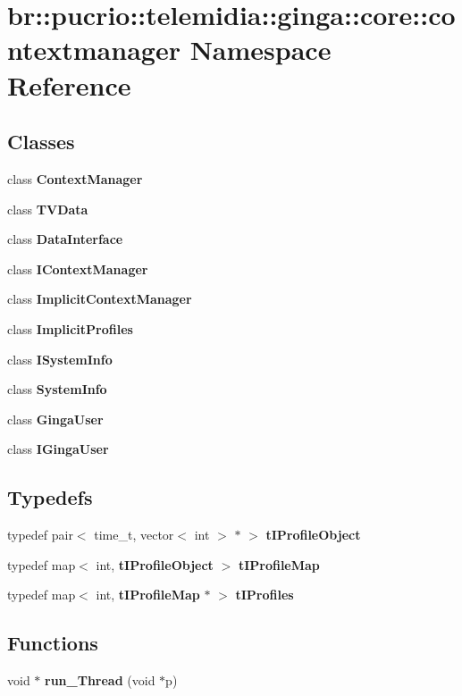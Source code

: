 \section{br::pucrio::telemidia::ginga::core::contextmanager Namespace Reference}
\label{namespacebr_1_1pucrio_1_1telemidia_1_1ginga_1_1core_1_1contextmanager}


\subsection*{Classes}
\begin{CompactItemize}
\item 
class {\bf ContextManager}
\item 
class {\bf TVData}
\item 
class {\bf DataInterface}
\item 
class {\bf IContextManager}
\item 
class {\bf ImplicitContextManager}
\item 
class {\bf ImplicitProfiles}
\item 
class {\bf ISystemInfo}
\item 
class {\bf SystemInfo}
\item 
class {\bf GingaUser}
\item 
class {\bf IGingaUser}
\end{CompactItemize}
\subsection*{Typedefs}
\begin{CompactItemize}
\item 
typedef pair$<$ time\_\-t, vector$<$ int $>$ $\ast$ $>$ {\bf tIProfileObject}
\item 
typedef map$<$ int, {\bf tIProfileObject} $>$ {\bf tIProfileMap}
\item 
typedef map$<$ int, {\bf tIProfileMap} $\ast$ $>$ {\bf tIProfiles}
\end{CompactItemize}
\subsection*{Functions}
\begin{CompactItemize}
\item 
void $\ast$ \textbf{run\_\-Thread} (void $\ast$p)\label{namespacebr_1_1pucrio_1_1telemidia_1_1ginga_1_1core_1_1contextmanager_3933129d1002147ed3a59db7bd53f1a0}

\end{CompactItemize}


